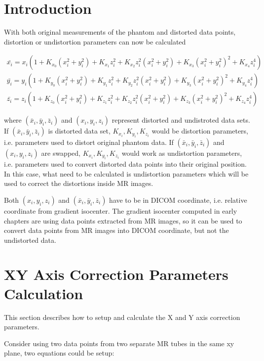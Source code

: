 \section{Introduction}
With both original measurements of the phantom and distorted data points, distortion or undistortion 
parameters can now be calculated 

\begin{eqnarray} \label{eq:spherical_harmonics}
\bar{x_i} = x_i(1 + K_{x_0}(x_i^2 + y_i^2) + K_{x_1}z_i^2 + K_{x_2}z_i^2(x_i^2 + y_i^2) 
+ K_{x_3}(x_i^2 + y_i^2)^2 + K_{x_4}z_i^4) \\
\bar{y_i} = y_i(1 + K_{y_0}(x_i^2 + y_i^2) + K_{y_1}z_i^2 + K_{y_2}z_i^2(x_i^2 + y_i^2) 
+ K_{y_3}(x_i^2 + y_i^2)^2 + K_{y_4}z_i^4) \\
\bar{z_i} = z_i(1 + K_{z_0}(x_i^2 + y_i^2) + K_{z_1}z_i^2 + K_{z_2}z_i^2(x_i^2 + y_i^2) 
+ K_{z_3}(x_i^2 + y_i^2)^2 + K_{z_4}z_i^4)
\end{eqnarray}

where $(\bar{x}_i, \bar{y}_i, \bar{z}_i)$ and $(x_i, y_i, z_i)$ represent distorted and undistroted data sets.
If $(\bar{x}_i, \bar{y}_i, \bar{z}_i)$ is distorted data set, $K_{x_i}, K_{y_i}, K_{z_i}$ would be 
distortion parameters, i.e. parameters used to distort original phantom data. If 
$(\bar{x}_i, \bar{y}_i, \bar{z}_i)$ and $(x_i, y_i, z_i)$ are swapped, $K_{x_i}, K_{y_i}, K_{z_i}$ would work as
undistortion parameters, i.e. parameters used to convert distorted data points into their original position.
In this case, what need to be calculated is undistortion parameters which will be used to correct the
distortions inside MR images.

Both $(x_i, y_i, z_i)$ and $(\bar{x}_i, \bar{y}_i, \bar{z}_i)$ have to be in DICOM coordinate, i.e. relative
coordinate from gradient isocenter. The gradient isocenter computed in early chapters are using data points
extracted from MR images, so it can be used to convert data points from MR images into DICOM coordinate, but 
not the undistorted data. 

\section{XY Axis Correction Parameters Calculation}
This section describes how to setup and calculate the X and Y axis correction parameters.

Consider using two data points from two separate MR tubes in the same xy plane, two equations could be
setup:

